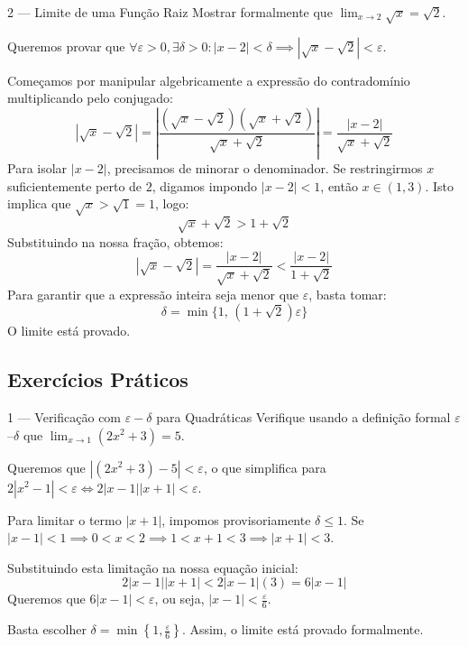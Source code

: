 \begin{exbox}{2 --- Limite de uma Função Raiz}
  Mostrar formalmente que $\lim_{x\to 2} \sqrt{x} = \sqrt{2}$.
\end{exbox}
\begin{solbox}
  Queremos provar que $\forall \varepsilon > 0, \exists \delta > 0 : |x-2| < \delta \implies |\sqrt{x}-\sqrt{2}| < \varepsilon$.
  
  Começamos por manipular algebricamente a expressão do contradomínio multiplicando pelo conjugado:
  \[
    |\sqrt{x}-\sqrt{2}| = \left| \frac{(\sqrt{x}-\sqrt{2})(\sqrt{x}+\sqrt{2})}{\sqrt{x}+\sqrt{2}} \right| = \frac{|x-2|}{\sqrt{x}+\sqrt{2}}
  \]
  Para isolar $|x-2|$, precisamos de minorar o denominador. Se restringirmos $x$ suficientemente perto de $2$, digamos impondo $|x-2| < 1$, então $x \in (1, 3)$. 
  Isto implica que $\sqrt{x} > \sqrt{1} = 1$, logo:
  \[
    \sqrt{x}+\sqrt{2} > 1+\sqrt{2}
  \]
  Substituindo na nossa fração, obtemos:
  \[
    |\sqrt{x}-\sqrt{2}| = \frac{|x-2|}{\sqrt{x}+\sqrt{2}} < \frac{|x-2|}{1+\sqrt{2}}
  \]
  Para garantir que a expressão inteira seja menor que $\varepsilon$, basta tomar:
  \[
    \delta = \min\bigl\{1, \, (1+\sqrt{2})\varepsilon\bigr\}
  \]
  O limite está provado. \checkmark
\end{solbox}

\subsection{Exercícios Práticos}

\begin{exercisebox}{1 --- Verificação com $\varepsilon-\delta$ para Quadráticas}
  Verifique usando a definição formal $\varepsilon$--$\delta$ que $\lim_{x\to 1}(2x^2+3)=5$.
\end{exercisebox}
\begin{solbox}
  Queremos que $| (2x^2+3) - 5 | < \varepsilon$, o que simplifica para $2|x^2-1| < \varepsilon \iff 2|x-1||x+1| < \varepsilon$.
  
  Para limitar o termo $|x+1|$, impomos provisoriamente $\delta \le 1$.
  Se $|x-1| < 1 \implies 0 < x < 2 \implies 1 < x+1 < 3 \implies |x+1| < 3$.
  
  Substituindo esta limitação na nossa equação inicial:
  \[
    2|x-1||x+1| < 2|x-1|(3) = 6|x-1|
  \]
  Queremos que $6|x-1| < \varepsilon$, ou seja, $|x-1| < \frac{\varepsilon}{6}$.
  
  Basta escolher $\delta = \min\left\{1, \frac{\varepsilon}{6}\right\}$. Assim, o limite está provado formalmente.
\end{solbox}

